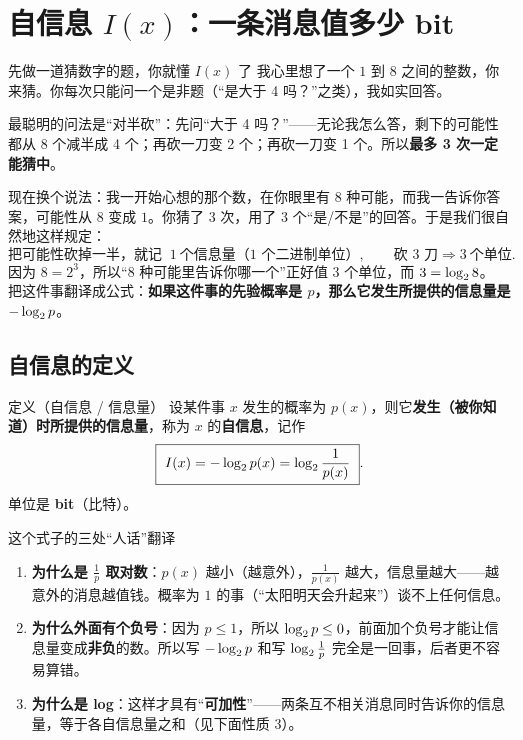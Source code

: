 \section{自信息 $I(x)$：一条消息值多少 bit}

\begin{idea}{先做一道猜数字的题，你就懂 $I(x)$ 了}
我心里想了一个 $1$ 到 $8$ 之间的整数，你来猜。你每次只能问一个是非题（“是大于 4 吗？”之类），我如实回答。

最聪明的问法是“对半砍”：先问“大于 4 吗？”——无论我怎么答，剩下的可能性都从 8 个减半成 4 个；再砍一刀变 2 个；再砍一刀变 1 个。所以\textbf{最多 3 次一定能猜中}。

现在换个说法：我一开始心想的那个数，在你眼里有 $8$ 种可能，而我一告诉你答案，可能性从 $8$ 变成 $1$。你猜了 $3$ 次，用了 $3$ 个“是/不是”的回答。于是我们很自然地这样规定：
\[
\text{把可能性砍掉一半，就记 }\ 1\ \text{个信息量（1 个二进制单位）},\qquad \text{砍 3 刀} \Rightarrow 3\ \text{个单位}.
\]
因为 $8=2^3$，所以“$8$ 种可能里告诉你哪一个”正好值 $3$ 个单位，而 $3=\log_{2} 8$。
把这件事翻译成公式：\textbf{如果这件事的先验概率是 $p$，那么它发生所提供的信息量是 $-\log_{2} p$}。
\end{idea}

\subsection{自信息的定义}

\begin{defbox}{定义（自信息 / 信息量）}
设某件事 $x$ 发生的概率为 $p(x)$，则它\textbf{发生（被你知道）时所提供的信息量}，称为 $x$ 的\textbf{自信息}，记作
\[
\boxed{\ I(x)=-\lb p(x)=\lb\frac{1}{p(x)}\ }.
\]
单位是 \textbf{bit}（比特）。
\end{defbox}

\begin{idea}{这个式子的三处“人话”翻译}
\begin{enumerate}[leftmargin=1.6em,itemsep=1pt,topsep=2pt]
  \item \textbf{为什么是 $\frac{1}{p}$ 取对数}：$p(x)$ 越小（越意外），$\frac{1}{p(x)}$ 越大，信息量越大——越意外的消息越值钱。概率为 $1$ 的事（“太阳明天会升起来”）谈不上任何信息。
  \item \textbf{为什么外面有个负号}：因为 $p\le1$，所以 $\log_{2} p\le0$，前面加个负号才能让信息量变成\textbf{非负}的数。所以写 $-\log_{2} p$ 和写 $\log_{2}\frac1p$ 完全是一回事，后者更不容易算错。
  \item \textbf{为什么是 log}：这样才具有“\textbf{可加性}”——两条互不相关消息同时告诉你的信息量，等于各自信息量之和（见下面性质 3）。
\end{enumerate}
\end{idea}

